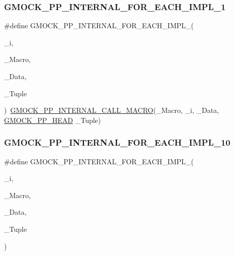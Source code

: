 \subsubsection{\texorpdfstring{GMOCK\_PP\_INTERNAL\_FOR\_EACH\_IMPL\_1}{GMOCK\_PP\_INTERNAL\_FOR\_EACH\_IMPL\_1}}
{\footnotesize\ttfamily \#define G\+M\+O\+C\+K\+\_\+\+P\+P\+\_\+\+I\+N\+T\+E\+R\+N\+A\+L\+\_\+\+F\+O\+R\+\_\+\+E\+A\+C\+H\+\_\+\+I\+M\+P\+L\+\_(\begin{DoxyParamCaption}\item[{}]{\+\_\+i,  }\item[{}]{\+\_\+\+Macro,  }\item[{}]{\+\_\+\+Data,  }\item[{}]{\+\_\+\+Tuple }\end{DoxyParamCaption})~\mbox{\hyperlink{_obj__test_2lib_2googletest-master_2googlemock_2include_2gmock_2internal_2gmock-pp_8h_a3fe0cf255d103cc945cd91e0e953846f}{G\+M\+O\+C\+K\+\_\+\+P\+P\+\_\+\+I\+N\+T\+E\+R\+N\+A\+L\+\_\+\+C\+A\+L\+L\+\_\+\+M\+A\+C\+RO}}(\+\_\+\+Macro, \+\_\+i, \+\_\+\+Data, \mbox{\hyperlink{_obj__test_2lib_2googletest-master_2googlemock_2include_2gmock_2internal_2gmock-pp_8h_ad7910160dfc0fb20b239efcf1f3ddd85}{G\+M\+O\+C\+K\+\_\+\+P\+P\+\_\+\+H\+E\+AD}} \+\_\+\+Tuple)}

\mbox{\label{googletest-master_2googlemock_2include_2gmock_2internal_2gmock-pp_8h_ae6a832612f7db9940c60e2551343f697}} 
\subsubsection{\texorpdfstring{GMOCK\_PP\_INTERNAL\_FOR\_EACH\_IMPL\_10}{GMOCK\_PP\_INTERNAL\_FOR\_EACH\_IMPL\_10}}
{\footnotesize\ttfamily \#define G\+M\+O\+C\+K\+\_\+\+P\+P\+\_\+\+I\+N\+T\+E\+R\+N\+A\+L\+\_\+\+F\+O\+R\+\_\+\+E\+A\+C\+H\+\_\+\+I\+M\+P\+L\+\_(\begin{DoxyParamCaption}\item[{}]{\+\_\+i,  }\item[{}]{\+\_\+\+Macro,  }\item[{}]{\+\_\+\+Data,  }\item[{}]{\+\_\+\+Tuple }\end{DoxyParamCaption})}

